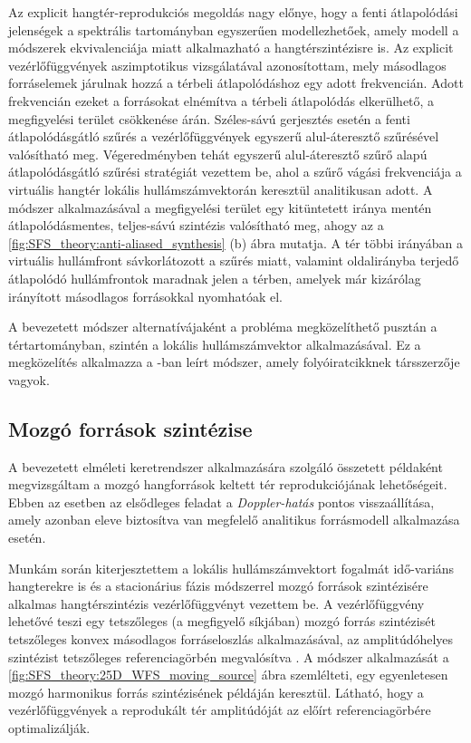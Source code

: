 \documentclass[10pt,twoside]{article}
\theoremstyle{thesisgroupstyle}
\theoremstyle{indented}
\begin{document}
Az explicit hangtér-reprodukciós megoldás nagy előnye, hogy a fenti átlapolódási jelenségek a spektrális tartományban egyszerűen modellezhetőek, amely modell a módszerek ekvivalenciája miatt alkalmazható a hangtérszintézisre is.
Az explicit vezérlőfüggvények aszimptotikus vizsgálatával azonosítottam, mely másodlagos forráselemek járulnak hozzá a térbeli átlapolódáshoz egy adott frekvencián.
Adott frekvencián ezeket a forrásokat elnémítva a térbeli átlapolódás elkerülhető, a megfigyelési terület csökkenése árán.
Széles-sávú gerjesztés esetén a fenti átlapolódásgátló szűrés a vezérlőfüggvények egyszerű alul-áteresztő szűrésével valósítható meg.
Végeredményben tehát egyszerű alul-áteresztő szűrő alapú átlapolódásgátló szűrési stratégiát vezettem be, ahol a szűrő vágási frekvenciája a virtuális hangtér lokális hullámszámvektorán keresztül analitikusan adott.
A módszer alkalmazásával a megfigyelési terület egy kitüntetett iránya mentén átlapolódásmentes, teljes-sávú szintézis valósítható meg, ahogy az a \ref{fig:SFS_theory:anti-aliased_synthesis} (b) ábra mutatja.
A tér többi irányában a virtuális hullámfront sávkorlátozott a szűrés miatt, valamint oldalirányba terjedő átlapolódó hullámfrontok maradnak jelen a térben, amelyek már kizárólag irányított másodlagos forrásokkal nyomhatóak el.

A bevezetett módszer alternatívájaként a probléma megközelíthető pusztán a tértartományban, szintén a lokális hullámszámvektor alkalmazásával.
Ez a megközelítés alkalmazza a \cite{8611109_booklet}-ban leírt módszer, amely folyóiratcikknek társszerzője vagyok.

\subsection{Mozgó források szintézise}

A bevezetett elméleti keretrendszer alkalmazására szolgáló összetett példaként megvizsgáltam a mozgó hangforrások keltett tér reprodukciójának lehetőségeit.
Ebben az esetben az elsődleges feladat a \emph{Doppler-hatás} pontos visszaállítása, amely azonban eleve biztosítva van megfelelő analitikus forrásmodell alkalmazása esetén.

Munkám során kiterjesztettem a lokális hullámszámvektort fogalmát idő-variáns hangterekre is és a stacionárius fázis módszerrel mozgó források szintézisére alkalmas hangtérszintézis vezérlőfüggvényt vezettem be.
A vezérlőfüggvény lehetővé teszi egy tetszőleges (a megfigyelő síkjában) mozgó forrás szintézisét tetszőleges konvex másodlagos forráseloszlás alkalmazásával, az amplitúdóhelyes szintézist tetszőleges referenciagörbén megvalósítva \cite{firtha2016wave_booklet, doi:10.1121/1.4996126_booklet, Firtha2015:daga_booklet}.
A módszer alkalmazását a \ref{fig:SFS_theory:25D_WFS_moving_source} ábra szemlélteti, egy egyenletesen mozgó harmonikus forrás szintézisének példáján keresztül.
Látható, hogy a vezérlőfüggvények a reprodukált tér amplitúdóját az előírt referenciagörbére optimalizálják. 
\end{document}

